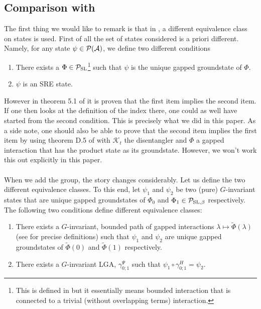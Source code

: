 \documentclass[12pt,a4paper,twoside]{article}
\numberwithin{equation}{section}
\begin{document}
\subsection{Comparison with \cite{ogata2021h3gmathbb}}\label{sec:SomeRemarks}
The first thing we would like to remark is that in \cite{ogata2021h3gmathbb}, a different equivalence class on states is used. First of all the set of states considered is a priori different. Namely, for any state $\psi\in \mathcal P(\mathcal A)$, we define two different conditions
\begin{enumerate}
	\item There exists a $\Phi\in\mathcal P_{\text{SL}}$\footnote{This is defined in \cite{ogata2021h3gmathbb} but it essentially means bounded interaction that is connected to a trivial (without overlapping terms) interaction.} such that $\psi$ is the unique gapped groundstate of $\Phi$.
	\item $\psi$ is an SRE state.
\end{enumerate}
However in theorem 5.1 of \cite{ogata2021h3gmathbb} it is proven that the first item implies the second item. If one then looks at the definition of the index there, one could as well have started from the second condition. This is precisely what we did in this paper. As a side note, one should also be able to prove that the second item implies the first item by using theorem D.5 of \cite{ogata2021h3gmathbb} with $\mathcal{K}_t$ the disentangler and $\Phi$ a gapped interaction that has the product state as its groundstate. However, we won't work this out explicitly in this paper.\\\\
When we add the group, the story changes considerably. Let us define the two different equivalence classes. To this end, let $\psi_1$ and $\psi_2$ be two (pure) $G$-invariant states that are unique gapped groundstates of $\Phi_0$ and $\Phi_1\in\mathcal P_{\text{SL},\beta}$ respectively. The following two conditions define different equivalence classes:
\begin{enumerate}
	\item There exists a $G$-invariant, bounded path of gapped interactions $\lambda\mapsto\tilde\Phi(\lambda)$ (see \cite{ogata2021h3gmathbb} for precise definitions) such that $\psi_1$ and $\psi_2$ are unique gapped groundstates of $\tilde{\Phi}(0)$ and $\tilde{\Phi}(1)$ respectively.
	\item There exists a $G$-invariant LGA, $\gamma^\Psi_{0;1}$ such that $\psi_1\circ\gamma^H_{0;1}=\psi_2$.
\end{enumerate}
\end{document}
